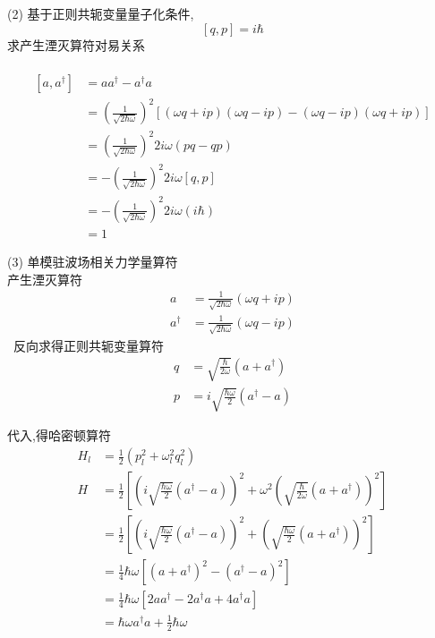 \begin{frame} 
(2) 基于正则共轭变量量子化条件,
  \[[ q,  p]= i \hbar\]
  求产生湮灭算符对易关系 \\
  {\解} ~ 
  \[\begin{aligned}
    [a,a ^\dagger] &= a a ^\dagger- a ^\dagger a \\ 
    &= (\frac{1}{\sqrt{2\hbar \omega}})^2 [(\omega q+i p)(\omega q - i p)-(\omega q-i p)(\omega q + i p)] \\ 
    &= (\frac{1}{\sqrt{2\hbar \omega}})^2  2i\omega( p q - q  p) \\ 
    &= - (\frac{1}{\sqrt{2\hbar \omega}})^2  2i\omega[ q,  p]  \\
    &= - (\frac{1}{\sqrt{2\hbar \omega}})^2  2i\omega (i\hbar)  \\
    &= 1
  \end{aligned}\]
\end{frame}

\begin{frame} 
  (3) 单模驻波场相关力学量算符 \\ 
  产生湮灭算符
  \[\begin{aligned}
    a &= \frac{1}{\sqrt{2\hbar \omega}} (\omega q+i p) \\ 
    a ^\dagger &= \frac{1}{\sqrt{2\hbar \omega}} (\omega q - i p)
    \end{aligned}\]
   反向求得正则共轭变量算符
  \[ \begin{aligned}
    q &= \sqrt{\frac{\hbar}{2 \omega}} (a + a ^\dagger ) \\ 
    p &= i\sqrt{\frac{\hbar\omega}{2 }} (a^\dagger -a)  
  \end{aligned} 
  \] 
\end{frame}

\begin{frame}
  代入,得哈密顿算符
  \[ \begin{aligned}
    H_l&= \frac{1}{2}(p_l ^2 + \omega_l ^2 q_l ^2 ) \\ 
    H& = \frac{1}{2} [ (i\sqrt{\frac{\hbar\omega}{2 }} (a^\dagger -a) )^2 + \omega ^2  (\sqrt{\frac{\hbar}{2 \omega}} (a + a ^\dagger ))^2] \\
    & = \frac{1}{2} [ (i\sqrt{\frac{\hbar\omega}{2 }} (a^\dagger -a) )^2 +  (\sqrt{\frac{\hbar\omega}{2 }} (a + a ^\dagger ))^2] \\
    & = \frac{1}{4}\hbar \omega [(a + a ^\dagger )^2-( a ^\dagger - a)^2 ] \\
    & = \frac{1}{4}\hbar \omega [2a a ^\dagger -  2a^\dagger a  + 4a ^\dagger a  ] \\
    &=  \hbar \omega a ^\dagger a + \frac{1}{2}\hbar \omega 
  \end{aligned} 
  \] 
\end{frame}

